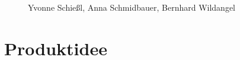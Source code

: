 \documentclass[a4paper, 12pt]{article}
\begin{document}
\begin{figure}[H] 
\centering
	\fbox{\begin{minipage}{13cm} 
	\end{minipage}}

	\vspace{0.3cm}

	\fbox{\begin{minipage}{13cm}  
	\end{minipage}}

	\vspace{0.3cm}

	\fbox{\begin{minipage}{13cm} 
	\end{minipage}}
	
Yvonne Schießl, Anna Schmidbauer, Bernhard Wildangel
	
\end{figure}

\section{Produktidee}
\end{document}
